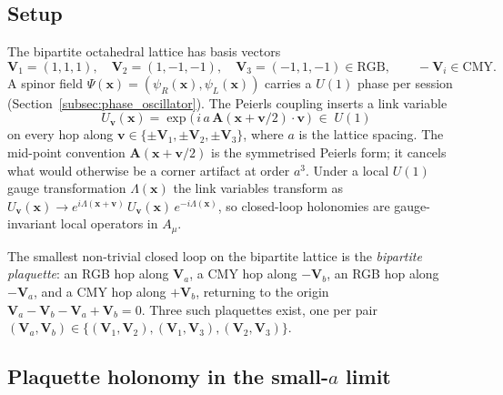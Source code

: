 \subsection{Setup}
\label{subsec:induced_setup}

The bipartite octahedral lattice has basis vectors
\begin{equation}
    \mathbf{V}_1 = (1, 1, 1),\quad
    \mathbf{V}_2 = (1, -1, -1),\quad
    \mathbf{V}_3 = (-1, 1, -1) \in \text{RGB},
    \qquad
    -\mathbf{V}_i \in \text{CMY}.
    \label{eq:basis_recap}
\end{equation}
A spinor field $\Psi(\mathbf{x}) = (\psi_R(\mathbf{x}), \psi_L(\mathbf{x}))$
carries a $U(1)$ phase per session
(Section~\ref{subsec:phase_oscillator}).  The Peierls coupling
inserts a link variable
\begin{equation}
    U_\mathbf{v}(\mathbf{x})
        = \exp\!\bigl(\,i\,a\,\mathbf{A}(\mathbf{x} + \mathbf{v}/2)
        \cdot \mathbf{v}\,\bigr) \;\in\; U(1)
    \label{eq:peierls_link}
\end{equation}
on every hop along $\mathbf{v} \in \{\pm\mathbf{V}_1,
\pm\mathbf{V}_2, \pm\mathbf{V}_3\}$, where $a$ is the lattice
spacing.  The mid-point convention
$\mathbf{A}(\mathbf{x} + \mathbf{v}/2)$ is the symmetrised Peierls
form; it cancels what would otherwise be a corner artifact at order
$a^3$.  Under a local $U(1)$ gauge transformation
$\Lambda(\mathbf{x})$ the link variables transform as
$U_\mathbf{v}(\mathbf{x}) \to e^{i\Lambda(\mathbf{x}+\mathbf{v})}\,
U_\mathbf{v}(\mathbf{x})\,e^{-i\Lambda(\mathbf{x})}$, so closed-loop
holonomies are gauge-invariant local operators in $A_\mu$.

The smallest non-trivial closed loop on the bipartite lattice is the
\emph{bipartite plaquette}: an RGB hop along $\mathbf{V}_a$, a CMY
hop along $-\mathbf{V}_b$, an RGB hop along $-\mathbf{V}_a$, and a
CMY hop along $+\mathbf{V}_b$, returning to the origin
$\mathbf{V}_a - \mathbf{V}_b - \mathbf{V}_a + \mathbf{V}_b = 0$.
Three such plaquettes exist, one per pair $(\mathbf{V}_a, \mathbf{V}_b)
\in \{(\mathbf{V}_1,\mathbf{V}_2), (\mathbf{V}_1,\mathbf{V}_3),
(\mathbf{V}_2,\mathbf{V}_3)\}$.

\subsection{Plaquette holonomy in the small-$a$ limit}
\label{subsec:induced_holonomy}

